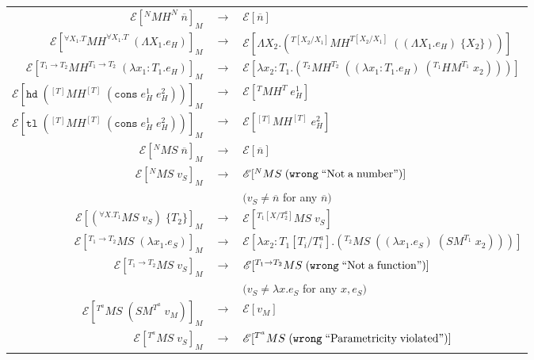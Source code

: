 \begin{figure}
\onehalfspacing
\begin{center}
\begin{tabular}{rcl}
$\mathscr{E}[^{N}MH^{N}\;\overline{n}]_{M}$ & $\rightarrow$ & $\mathscr{E}[\overline{n}]$ \\
$\mathscr{E}[^{\forall X_{1}.T}MH^{\forall X_{1}.T}\;(\Lambda X_{1}.e_{H})]_{M}$ & $\rightarrow$ & $\mathscr{E}[\Lambda X_{2}.(^{T[X_{2}/X_{1}]}MH^{T[X_{2}/X_{1}]}\;((\Lambda X_{1}.e_{H})\;\lbrace X_{2}\rbrace))]$ \\
$\mathscr{E}[^{T_{1}\rightarrow T_{2}}MH^{T_{1}\rightarrow T_{2}}\;(\lambda x_{1}:T_{1}.e_{H})]_{M}$ & $\rightarrow$ & $\mathscr{E}[\lambda x_{2}:T_{1}.(^{T_{2}}MH^{T_{2}}\;((\lambda x_{1}:T_{1}.e_{H})\;(^{T_{1}}HM^{T_{1}}\;x_{2})))]$ \\
$\mathscr{E}[\mathtt{hd}\;(^{[T]}MH^{[T]}\;(\mathtt{cons}\;e_{H}^{1}\;e_{H}^{2}))]_{M}$ & $\rightarrow$ & $\mathscr{E}[^{T}MH^{T}\;e_{H}^{1}]$ \\
$\mathscr{E}[\mathtt{tl}\;(^{[T]}MH^{[T]}\;(\mathtt{cons}\;e_{H}^{1}\;e_{H}^{2}))]_{M}$ & $\rightarrow$ & $\mathscr{E}[^{[T]}MH^{[T]}\;e_{H}^{2}]$ \\
$\mathscr{E}[^{N}MS\;\overline{n}]_{M}$ & $\rightarrow$ & $\mathscr{E}[\overline{n}]$ \\
$\mathscr{E}[^{N}MS\;v_{S}]_{M}$ & $\rightarrow$ & $\mathscr{E}[^{N}MS\;(\mathtt{wrong}\;\mathrm{``Not\;a\;number"})]$ \\
&& $(v_{S}\neq\overline{n}$ for any $\overline{n})$ \\
$\mathscr{E}[(^{\forall X.T_{1}}MS\;v_{S})\;\lbrace T_{2}\rbrace]_{M}$ & $\rightarrow$ & $\mathscr{E}[^{T_{1}[X/T^{a}_{2}]}MS\;v_{S}]$ \\
$\mathscr{E}[^{T_{1}\rightarrow T_{2}}MS\;(\lambda x_{1}.e_{S})]_{M}$ & $\rightarrow$ & $\mathscr{E}[\lambda x_{2}:T_{1}[T_{i}/T^{a}_{i}].(^{T_{2}}MS\;((\lambda x_{1}.e_{S})\;(SM^{T_{1}}\;x_{2})))]$ \\
$\mathscr{E}[^{T_{1}\rightarrow T_{2}}MS\;v_{S}]_{M}$ & $\rightarrow$ & $\mathscr{E}[^{T_{1}\rightarrow T_{2}}MS\;(\mathtt{wrong}\;\mathrm{``Not\;a\;function"})]$ \\
&& $(v_{S}\neq\lambda x.e_{S}$ for any $x,e_{S})$ \\
$\mathscr{E}[^{T^{a}}MS\;(SM^{T^{a}}\;v_{M})]_{M}$ & $\rightarrow$ & $\mathscr{E}[v_{M}]$ \\
$\mathscr{E}[^{T^{a}}MS\;v_{S}]_{M}$ & $\rightarrow$ & $\mathscr{E}[^{T^{a}}MS\;(\mathtt{wrong}\;\mathrm{``Parametricity\;violated"})]$ \\

\end{tabular}
\end{center}
\end{figure}
